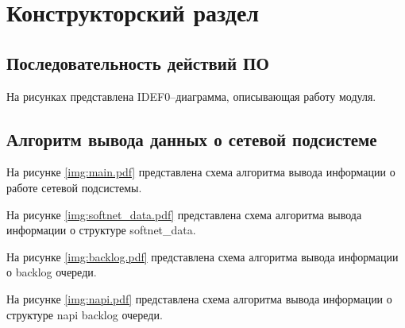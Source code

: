 \chapter{Конструкторский раздел}

\section{Последовательность действий ПО}

На рисунках представлена IDEF0--диаграмма, описывающая работу модуля.

\section{Алгоритм вывода данных о сетевой подсистеме}

На рисунке \ref{img:main.pdf} представлена схема алгоритма вывода информации о работе сетевой подсистемы.

\FloatBarrier

На рисунке \ref{img:softnet_data.pdf} представлена схема алгоритма вывода информации о структуре softnet\_data.

\FloatBarrier

На рисунке \ref{img:backlog.pdf} представлена схема алгоритма вывода информации о backlog очереди.

\FloatBarrier

На рисунке \ref{img:napi.pdf} представлена схема алгоритма вывода информации о структуре napi backlog очереди.

